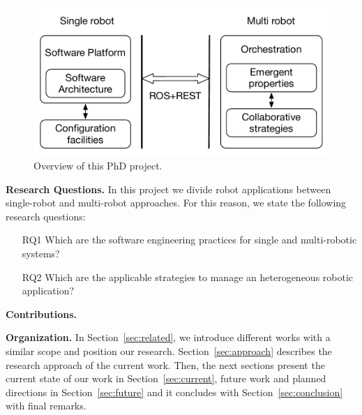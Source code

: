 \begin{figure}[!t]
\begin{center}
\includegraphics[width=1\linewidth]{Figures/research.pdf}
\caption{Overview of this PhD project.}
\label{fig:overview}
\end{center}
\end{figure}

\textbf{Research Questions.} 
In this project we divide robot applications between single-robot and multi-robot approaches.
For this reason, we state the following research questions:
\begin{itemize}
\item[RQ1] Which are the software engineering practices for single and multi-robotic systems? 
\item[RQ2] Which are the applicable strategies to manage an heterogeneous robotic application?
\end{itemize}

\textbf{Contributions.} 


\textbf{Organization.} 
In Section~\ref{sec:related}, we introduce different works with a similar scope and position our research.
Section~\ref{sec:approach} describes the research approach of the current work.
Then, the next sections present the current state of our work in Section~\ref{sec:current}, future work and planned directions in Section~\ref{sec:future} and it concludes with Section~\ref{sec:conclusion} with final remarks.